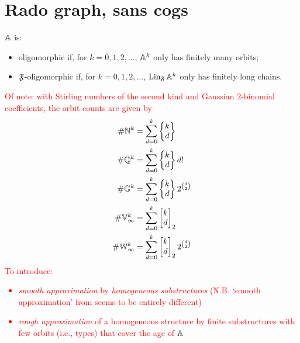 \section{Rado graph, sans cogs}

$\mathbb{A}$ is: 
\begin{itemize}
    \item oligomorphic if, for $k = 0, 1, 2, \ldots$, $\mathbb{A}^k$ only has finitely many orbits;
    \item $\mathfrak{F}$-oligomorphic if, for $k = 0, 1, 2, \ldots$, $\operatorname{Lin}_{\mathfrak{F}} \mathbb{A}^k$ only has finitely long chains.
\end{itemize}
\textcolor{red}{
Of note: with Stirling numbers of the second kind and Gaussian $2$-binomial coefficients,
the orbit counts are given by
\begin{align*}
    \# \mathbb{N}^k &= \sum_{d=0}^k \begin{Bmatrix} k \\ d \end{Bmatrix} \\
    \# \mathbb{Q}^k &= \sum_{d=0}^k \begin{Bmatrix} k \\ d \end{Bmatrix} d! \\
    \# \mathbb{G}^k &= \sum_{d=0}^k \begin{Bmatrix} k \\ d \end{Bmatrix} 2^{\binom{d}{2}} \\
    \# \mathbb{V}_\infty^k &= \sum_{d=0}^k \begin{bmatrix} k \\ d \end{bmatrix}_2 \\
    \# \mathbb{W}_\infty^k &= \sum_{d=0}^k \begin{bmatrix} k \\ d \end{bmatrix}_2 2^{\binom{d}{2}}
\end{align*}
To introduce: 
\begin{itemize}
    \item 
    \emph{smooth approximation} by \emph{homogeneous substructures} \cite{KLM89} (N.B. `smooth approximation' from \cite[Definition~4]{MP24} seems to be entirely different)
    \item 
    \emph{rough approximation} of a homogeneous structure by finite substructures with few orbits (i.e., types)
    that cover the age of $\mathbb{A}$
\end{itemize}}

